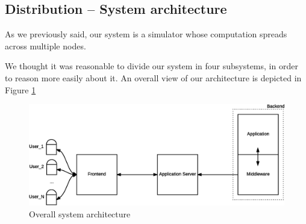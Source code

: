 \subsection{Distribution -- System architecture}
As we previously said, our system is a simulator whose computation spreads
across multiple nodes.

We thought it was reasonable to divide our system in four subsystems, in order
to reason more easily about it. An overall view of our architecture is depicted
in Figure \ref{fig:sd-sys-arch-overall}

\begin{figure}[H]
  \centering
  \includegraphics[scale=0.5,keepaspectratio]
    {images/solution/overall-arch.eps}
  \caption{Overall system architecture}
  \label{fig:sd-sys-arch-overall}
\end{figure}
